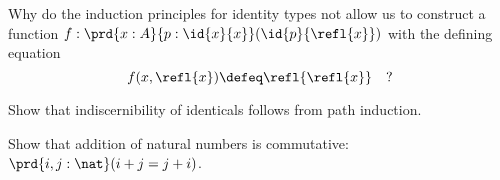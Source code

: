 \begin{ex}\label{ex:without-K}
  Why do the induction principles for identity types not allow us to construct a function $f: \prd{x:A}{p:\id{x}{x}} (\id{p}{\refl{x}})$ with the defining equation
  \[ f(x,\refl{x}) \defeq \refl{\refl{x}} \quad ?\]
\end{ex}

\begin{ex}\label{ex:subtFromPathInd}
  Show that indiscernibility of identicals follows from path induction.  
\end{ex}

\begin{ex}\label{ex:add-nat-commutative}
  Show that addition of natural numbers is commutative: $\prd{i,j:\nat} (i+j=j+i)$.
\end{ex}

